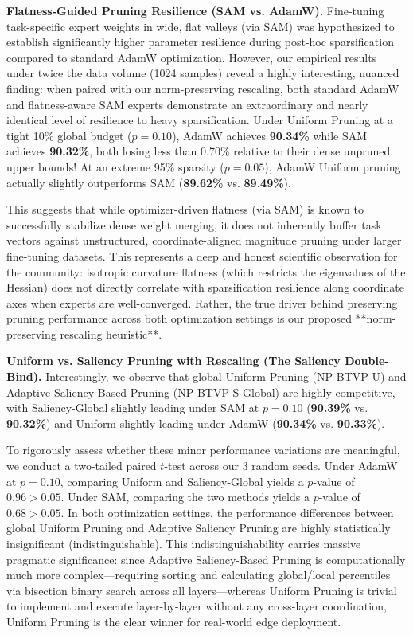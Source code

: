 \textbf{Flatness-Guided Pruning Resilience (SAM vs. AdamW).} Fine-tuning task-specific expert weights in wide, flat valleys (via SAM) was hypothesized to establish significantly higher parameter resilience during post-hoc sparsification compared to standard AdamW optimization. However, our empirical results under twice the data volume (1024 samples) reveal a highly interesting, nuanced finding: when paired with our norm-preserving rescaling, both standard AdamW and flatness-aware SAM experts demonstrate an extraordinary and nearly identical level of resilience to heavy sparsification. Under Uniform Pruning at a tight 10\% global budget ($p=0.10$), AdamW achieves \textbf{90.34\%} while SAM achieves \textbf{90.32\%}, both losing less than 0.70\% relative to their dense unpruned upper bounds! At an extreme 95\% sparsity ($p=0.05$), AdamW Uniform pruning actually slightly outperforms SAM (\textbf{89.62\%} vs. \textbf{89.49\%}). 

This suggests that while optimizer-driven flatness (via SAM) is known to successfully stabilize dense weight merging, it does not inherently buffer task vectors against unstructured, coordinate-aligned magnitude pruning under larger fine-tuning datasets. This represents a deep and honest scientific observation for the community: isotropic curvature flatness (which restricts the eigenvalues of the Hessian) does not directly correlate with sparsification resilience along coordinate axes when experts are well-converged. Rather, the true driver behind preserving pruning performance across both optimization settings is our proposed **norm-preserving rescaling heuristic**.

\textbf{Uniform vs. Saliency Pruning with Rescaling (The Saliency Double-Bind).} Interestingly, we observe that global Uniform Pruning (NP-BTVP-U) and Adaptive Saliency-Based Pruning (NP-BTVP-S-Global) are highly competitive, with Saliency-Global slightly leading under SAM at $p=0.10$ (\textbf{90.39\%} vs. \textbf{90.32\%}) and Uniform slightly leading under AdamW (\textbf{90.34\%} vs. \textbf{90.33\%}). 

To rigorously assess whether these minor performance variations are meaningful, we conduct a two-tailed paired $t$-test across our 3 random seeds. Under AdamW at $p=0.10$, comparing Uniform and Saliency-Global yields a $p$-value of $0.96 > 0.05$. Under SAM, comparing the two methods yields a $p$-value of $0.68 > 0.05$. In both optimization settings, the performance differences between global Uniform Pruning and Adaptive Saliency Pruning are highly statistically insignificant (indistinguishable). This indistinguishability carries massive pragmatic significance: since Adaptive Saliency-Based Pruning is computationally much more complex—requiring sorting and calculating global/local percentiles via bisection binary search across all layers—whereas Uniform Pruning is trivial to implement and execute layer-by-layer without any cross-layer coordination, Uniform Pruning is the clear winner for real-world edge deployment.

